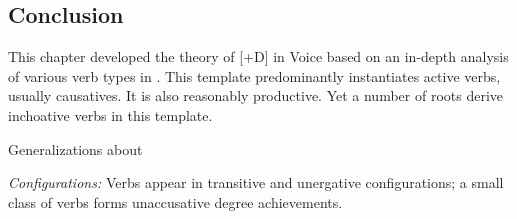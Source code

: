 \begin{exe}
\begin{xlist}
\begin{xlist}
\begin{exe}
\begin{exe}
\begin{xlist}
\begin{exe}
\begin{xlist}
\begin{exe}
\begin{xlist}
\begin{xlist}
\begin{exe}
\begin{xlist}
\begin{exe}
\begin{xlist}
\begin{exe}
\begin{xlist}
\begin{exe}
\begin{exe}
\begin{exe}
\begin{xlist}
\begin{exe}
\begin{exe}
\begin{xlist}
\begin{xlist}
\begin{exe}
\begin{xlist}
\begin{exe}
\begin{exe}
\begin{xlist}
\begin{exe}
\begin{exe}
\begin{xlist}
\begin{exe}
\begin{xlist}
\begin{exe}
\begin{xlist}
\begin{exe}
\begin{xlist}
\begin{exe}
\begin{exe}
\begin{xlist}
\begin{exe}
\begin{exe}
\begin{xlist}
\begin{xlist}
\begin{exe}
\begin{xlist}
\begin{xlist}
\begin{exe}
\begin{xlist}
\begin{exe}
\begin{xlist}
\begin{exe}
\begin{xlist}
\begin{exe}
\begin{xlist}
\begin{exe}
\begin{exe}
\begin{exe}
\begin{exe}
\begin{xlist}
\begin{exe}
\begin{exe}
\begin{xlist}
\begin{xlist}
\begin{exe}
\begin{exe}
\begin{xlist}
\begin{exe}
\begin{xlist}
\begin{exe}
\begin{xlist}
\begin{exe}
\begin{xlist}
\begin{exe}
\begin{xlist}
\begin{exe}
\begin{exe}
\begin{exe}
\begin{exe}
\begin{xlist}
\begin{exe}
\begin{xlist}
\begin{exe}
\begin{xlist}
\begin{exe}
\begin{xlist}
\begin{exe}
\begin{xlist}
\begin{exe}
\begin{xlist}
\begin{exe}
\section{Conclusion} \label{vd:sum}
This chapter developed the theory of [+D] in Voice based on an in-depth analysis of various verb types in {\thif}.
This template predominantly instantiates active verbs, usually causatives. It is also reasonably productive. Yet a number of roots derive inchoative verbs in this template.

 \begin{exe}
 \ex  \label{ex:gen-thif-sum}Generalizations about {\thif}
 \begin{xlist} 
 	\ex  \textit{Configurations:} Verbs appear in transitive and unergative configurations; a small class of verbs forms unaccusative degree achievements. 

\end{xlist}
\end{exe}
\end{exe}
\end{xlist}
\end{exe}
\end{xlist}
\end{exe}
\end{xlist}
\end{exe}
\end{xlist}
\end{exe}
\end{xlist}
\end{exe}
\end{xlist}
\end{exe}
\end{exe}
\end{exe}
\end{exe}
\end{xlist}
\end{exe}
\end{xlist}
\end{exe}
\end{xlist}
\end{exe}
\end{xlist}
\end{exe}
\end{xlist}
\end{exe}
\end{exe}
\end{xlist}
\end{xlist}
\end{exe}
\end{exe}
\end{xlist}
\end{exe}
\end{exe}
\end{exe}
\end{exe}
\end{xlist}
\end{exe}
\end{xlist}
\end{exe}
\end{xlist}
\end{exe}
\end{xlist}
\end{exe}
\end{xlist}
\end{xlist}
\end{exe}
\end{xlist}
\end{xlist}
\end{exe}
\end{exe}
\end{xlist}
\end{exe}
\end{exe}
\end{xlist}
\end{exe}
\end{xlist}
\end{exe}
\end{xlist}
\end{exe}
\end{xlist}
\end{exe}
\end{exe}
\end{xlist}
\end{exe}
\end{exe}
\end{xlist}
\end{exe}
\end{xlist}
\end{xlist}
\end{exe}
\end{exe}
\end{xlist}
\end{exe}
\end{exe}
\end{exe}
\end{xlist}
\end{exe}
\end{xlist}
\end{exe}
\end{xlist}
\end{exe}
\end{xlist}
\end{xlist}
\end{exe}
\end{xlist}
\end{exe}
\end{xlist}
\end{exe}
\end{exe}
\end{xlist}
\end{xlist}
\end{exe}
